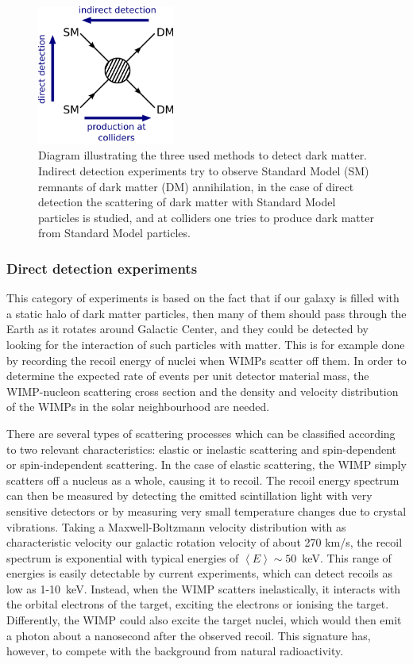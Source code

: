 \begin{figure}[ht]
  \centering
  \includegraphics[width=0.4\textwidth]{DM_production.pdf}\hfill%
  \caption{Diagram illustrating the three used methods to detect dark matter. Indirect detection experiments try to observe Standard Model (SM) remnants of dark matter (DM) annihilation, in the case of direct detection the scattering of dark matter with Standard Model particles is studied, and at colliders one tries to produce dark matter from Standard Model particles.}
  \label{fig:DM_production}
\end{figure}

\subsubsection{Direct detection experiments}

This category of experiments is based on the fact that if our galaxy is filled with a static halo of dark matter particles, then many of them should pass through the Earth as it rotates around Galactic Center, and they could be detected by looking for the interaction of such particles with matter. This is for example done by recording the recoil energy of nuclei when \acp{WIMP} scatter off them. In order to determine the expected rate of events per unit detector material mass, the \ac{WIMP}-nucleon scattering cross section and the density and velocity distribution of the \acp{WIMP} in the solar neighbourhood are needed.

There are several types of scattering processes which can be classified according to two relevant characteristics: elastic or inelastic scattering and spin-dependent or spin-independent scattering. In the case of elastic scattering, the \ac{WIMP} simply scatters off a nucleus as a whole, causing it to recoil. The recoil energy spectrum can then be measured by detecting the emitted scintillation light with very sensitive detectors or by measuring very small temperature changes due to crystal vibrations. Taking a Maxwell-Boltzmann velocity distribution with as characteristic velocity our galactic rotation velocity of about 270 km/s, the recoil spectrum is exponential with typical energies of $\left\langle E \right\rangle \sim 50$~keV. This range of energies is easily detectable by current experiments, which can detect recoils as low as 1-10~keV. Instead, when the \ac{WIMP} scatters inelastically, it interacts with the orbital electrons of the target, exciting the electrons or ionising the target. Differently, the \ac{WIMP} could also excite the target nuclei, which would then emit a photon about a nanosecond after the observed recoil. This signature has, however, to compete with the background from natural radioactivity.


